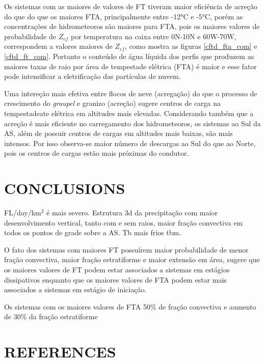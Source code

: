 \documentclass[preprint,authoryear,3p]{elsarticle}
\begin{document}
\begin{multicols}{2}
Os sistemas com as maiores de valores de FT tiveram maior eficiência de acreção do que do que os maiores FTA, principalmente entre -12°C e -5°C, porém as concentrações de hidrometeoros são maiores para FTA, pois os maiores valores de probabilidade de $Z_{ef}$ por temperatura na caixa entre 0N-10N e 60W-70W, correspondem a valores maiores de $Z_{ef}$, como mostra as figuras \ref{cftd_fta_com} e \ref{cftd_ft_com}. Portanto o conteúdo de água líquida dos perfis que produzem as maiores taxas de raio por área de tempestade elétrica (FTA) é maior e esse fator pode intensificar a eletrificação das partículas de nuvem.


Uma intereção mais efetiva entre flocos de neve (acregação) do que o processo de crescimento do \textit{graupel} e granizo (acreção) sugere centros de carga na tempestadeate elétrica em altitudes mais elevadas. Considerando também que a acreção é mais eficiente no carregamento dos hidrometeoros, os sistemas ao Sul da AS, além de possuir centros de cargas em altitudes mais baixas, são mais intensos. Por isso observa-se maior número de descargas ao Sul do que ao Norte, pois os centros de cargas estão mais próximas do condutor.
 
 

\section{CONCLUSIONS}

FL/day/km$^{2}$ é mais severo. Estrutura 3d da precipitação com maior desenvolvimento vertical, tanto com e sem raios, maior fração convectiva em todos os pontos de grade sobre a AS. Tb mais frios tbm.

O fato dos sistemas com maiores FT possuírem maior probabilidade de menor fração convectiva, maior fração estratiforme e maior extensão em área, sugere que os maiores valores de FT podem estar associados a sistemas em estágios dissipativos enquanto que os maiores valores de FTA podem estar mais associados a sistemas em estágio de iniciação.


Os sistemas com os maiores valores de FTA 50\% de fração convectiva e aumento de 30\% da fração estratiforme

\section{REFERENCES}




\end{multicols}
\end{document}
